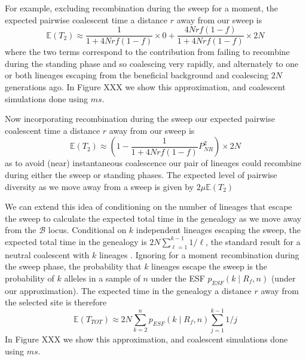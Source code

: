 \documentclass[a4paper,10pt]{article}
\newcommand{\fancyB}{$\mathcal B$ }
\begin{document}
For example, excluding recombination during the sweep for a moment, the expected pairwise coalescent time a distance $r$ away from our sweep is
\begin{equation}
	\mathbb{E}(T_2)\approx \frac{1}{1 + 4Nrf(1-f)} \times 0 + \frac{4Nrf(1-f)}{1 + 4Nrf(1-f)} \times 2N
\end{equation}
where the two terms correspond to the contribution from failing to recombine during the standing phase and so coalescing very rapidly, and alternately to one or both lineages escaping from the beneficial background and coalescing $2N$ generations ago. In Figure XXX we show this approximation, and coalescent simulations done using $ms$. 

Now incorporating recombination during the sweep our expected pairwise coalescent time a distance $r$ away from our sweep is 
\begin{equation}
	\mathbb{E}(T_2) \approx \left(1-\frac{1}{1 + 4Nrf(1-f)} P_{NR}^2  \right) \times 2N
\end{equation}
as to avoid (near) instantaneous coalescence our pair of lineages could recombine during either the sweep or standing phases. The expected level of pairwise diversity as we move away from a sweep is given by $2\mu \mathbb{E}(T_2)$

We can extend this idea of conditioning on the number of lineages that escape the sweep to calculate the expected total time in the genealogy as we move away from the \fancyB locus. Conditional on  $k$ independent lineages escaping the sweep, the expected total time in the genealogy is $2N \sum_{\ell=1}^{k-1} 1/\ell$, the standard result for a neutral coalescent with $k$ lineages \citep{Watterson}. Ignoring for a moment recombination during the sweep phase, the probability that $k$ lineages escape the sweep is the probability of $k$ alleles in a sample of $n$ under the ESF $p_{ESF}(k\mid R_f,n)$ (under our approximation). The expected time in the genealogy a distance $r$ away from the selected site is therefore
\begin{equation}
	\mathbb{E}(T_{TOT})  \approx 2N \sum_{k=2}^n p_{ESF}(k\mid R_f,n)   \sum_{j=1}^{k-1} 1/j
\end{equation}
In Figure XXX we show this approximation, and coalescent simulations done using $ms$. 
\end{document}
